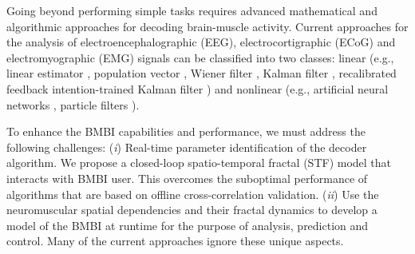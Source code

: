 Going beyond performing simple tasks requires advanced mathematical and algorithmic approaches for decoding brain-muscle activity. Current approaches for the analysis of electroencephalographic (EEG), electrocortigraphic (ECoG) and electromyographic (EMG) signals can be classified into two classes: linear (e.g., linear estimator \cite{Collinger}\cite{Salinas}, population vector \cite{Velliste}, Wiener filter \cite{Ethier}, Kalman filter \cite{Kim}, recalibrated feedback intention-trained Kalman filter \cite{Fan}) and nonlinear (e.g., artificial neural networks \cite{Sanchez}\cite{Sussillo}, particle filters \cite{Shoham}). 

To enhance the BMBI capabilities and performance, we must address the following challenges: (\textit{i}) Real-time parameter identification of the decoder algorithm. We propose a closed-loop spatio-temporal fractal (STF) model that interacts with BMBI user. This overcomes the suboptimal performance of algorithms that are based on offline cross-correlation validation. (\textit{ii}) Use the neuromuscular spatial dependencies and their fractal dynamics to develop a model of the BMBI at runtime for the purpose of analysis, prediction and control. Many of the current approaches ignore these unique aspects.

